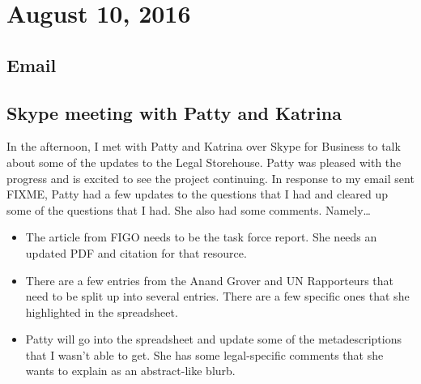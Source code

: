 \documentclass{article}
\begin{document}

\section{August 10, 2016}
\subsection{Email }
\subsection{Skype meeting with Patty and Katrina}
In the afternoon, I met with Patty and Katrina over Skype for Business to talk about some of the updates to the Legal Storehouse. Patty was pleased with the progress and is excited to see the project continuing. In response to my email sent FIXME, Patty had a few updates to the questions that I had and cleared up some of the questions that I had. She also had some comments. Namely\dots
\begin{itemize}
    \item The article from FIGO needs to be the task force report. She needs an updated PDF and citation for that resource.
    \item There are a few entries from the Anand Grover and UN Rapporteurs that need to be split up into several entries. There are a few specific ones that she highlighted in the spreadsheet.
    \item Patty will go into the spreadsheet and update some of the metadescriptions that I wasn't able to get. She has some legal-specific comments that she wants to explain as an abstract-like blurb.
\end{itemize}

\clearpage

\clearpage

\nocite{Blair1990,Feinberg2010,Feinberg2013,Feinberg2013-Beyond}


\clearpage
\printindex
\end{document}
